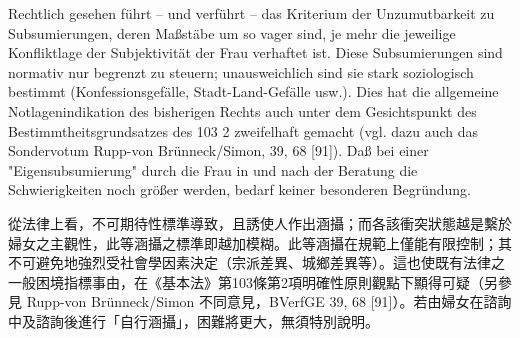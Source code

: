 \documentclass[12pt]{article}
\begin{document}
\begin{sourcepara}[title={原文SondervotumMS.286}]
Rechtlich gesehen führt -- und verführt -- das Kriterium der Unzumutbarkeit zu Subsumierungen, deren Maßstäbe um so vager sind, je mehr die jeweilige Konfliktlage der Subjektivität der Frau verhaftet ist. Diese Subsumierungen sind normativ nur begrenzt zu steuern; unausweichlich sind sie stark soziologisch bestimmt (Konfessionsgefälle, Stadt-Land-Gefälle usw.). Dies hat die allgemeine Notlagenindikation des bisherigen Rechts auch unter dem Gesichtspunkt des Bestimmtheitsgrundsatzes des \abbrArt{} 103 \abbrAbs{} 2 \abbrGG{}\ggfnArtOneZeroThreeTwoDE{} zweifelhaft gemacht (vgl. dazu auch das Sondervotum Rupp-von Brünneck/Simon, \abbrBVerfGE{} 39, 68 [91]). Daß bei einer "Eigensubsumierung" durch die Frau in und nach der Beratung die Schwierigkeiten noch größer werden, bedarf keiner besonderen Begründung.
\end{sourcepara}
\begin{transpara}
從法律上看，不可期待性標準導致，且誘使人作出涵攝；而各該衝突狀態越是繫於婦女之主觀性，此等涵攝之標準即越加模糊。此等涵攝在規範上僅能有限控制；其不可避免地強烈受社會學因素決定（宗派差異、城鄉差異等）。這也使既有法律之一般困境指標事由，在《基本法》第103條第2項\ggfnArtOneZeroThreeTwoZH{}明確性原則觀點下顯得可疑（另參見 Rupp-von Brünneck/Simon 不同意見，BVerfGE 39, 68 [91]）。若由婦女在諮詢中及諮詢後進行「自行涵攝」，困難將更大，無須特別說明。
\end{transpara}
\end{document}
